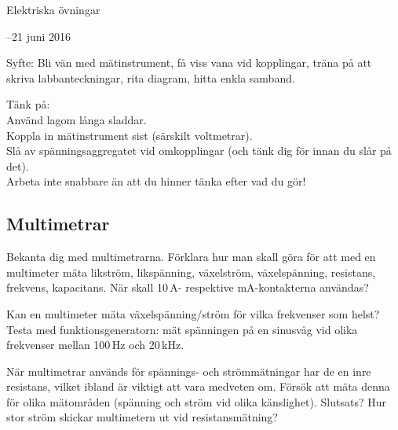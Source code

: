 \documentclass[a4paper,11pt]{article}
\begin{document}
\begin{center}
 {\sf \LARGE Elektriska övningar}
\end{center}


\begin{center}
 {--21 juni 2016}
\end{center}

\vspace{5mm} 


Syfte: Bli vän med mätinstrument, få viss vana vid kopplingar, träna 
på att skriva labbanteckningar, rita diagram, hitta enkla samband. 
 
{\sf  Tänk på:\\
Använd lagom långa sladdar.\\
Koppla in mätinstrument sist (särskilt voltmetrar).\\
Slå av spänningsaggregatet vid omkopplingar (och tänk dig för innan 
du slår på det).\\
Arbeta inte snabbare än att du hinner tänka efter vad du gör!}

\subsection*{Multimetrar}

Bekanta dig med multimetrarna.  Förklara
hur man skall göra för att med en multimeter mäta likström,
likspänning, växelström, växelspänning, resistans, 
frekvens, kapacitans. När skall 10\,A- respektive mA-kontakterna 
användas?



Kan en multimeter mäta växelspänning/ström för vilka frekvenser som 
helst? Testa med funktionsgeneratorn: mät spänningen på en sinusvåg vid olika
frekvenser mellan 100\,Hz och 20\,kHz.

När multimetrar används för spännings- och strömmätningar
har de en inre resistans, vilket ibland är viktigt att vara medveten
om. Försök att mäta denna för olika mätområden (spänning och ström vid olika
känslighet). Slutsats? Hur stor ström skickar multimetern ut vid
resistansmätning? 
\end{document}
